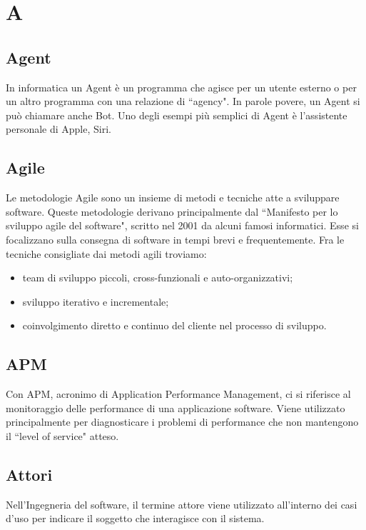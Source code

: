 \section{A}

    \subsection*{Agent}

        In informatica un Agent è un programma che agisce per un utente esterno o per un altro programma con una relazione
        di ``agency". In parole povere, un Agent si può chiamare anche Bot.
        Uno degli esempi più semplici di Agent è l'assistente personale di Apple, Siri.

    \subsection*{Agile}

        Le metodologie Agile sono un insieme di metodi e tecniche atte a sviluppare software.
        Queste metodologie derivano principalmente dal ``Manifesto per lo sviluppo agile del software", scritto
        nel 2001 da alcuni famosi informatici.
        Esse si focalizzano sulla consegna di software in tempi brevi e frequentemente.
        Fra le tecniche consigliate dai metodi agili troviamo:

        \begin{itemize}
            \item team di sviluppo piccoli, cross-funzionali e auto-organizzativi;
            \item sviluppo iterativo e incrementale;
            \item coinvolgimento diretto e continuo del cliente nel processo di sviluppo.
        \end{itemize}

    \subsection*{APM}

        Con APM, acronimo di Application Performance Management, ci si riferisce al monitoraggio delle performance di
        una applicazione software.
        Viene utilizzato principalmente per diagnosticare i problemi di performance che non mantengono il ``level of
        service" atteso.
        
    \subsection*{Attori}

        Nell'Ingegneria del software, il termine attore viene utilizzato all'interno dei casi d'uso per indicare il
        soggetto che interagisce con il sistema.
